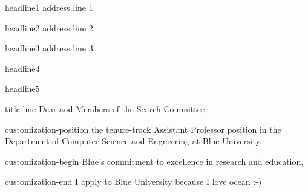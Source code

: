 headline1%
address line 1

headline2%
address line 2

headline3%
address line 3

headline4%
\vspace{-8pt}

headline5%
\vspace{-8pt}


title-line%
Dear  and Members of the Search Committee,

customization-position%
the tenure-track Assistant Professor position in the Department of Computer Science and Engneering at Blue University.

customization-begin%
Blue's commitment to excellence in research and education, 

customization-end%
I apply to Blue University because I love ocean :-) 

